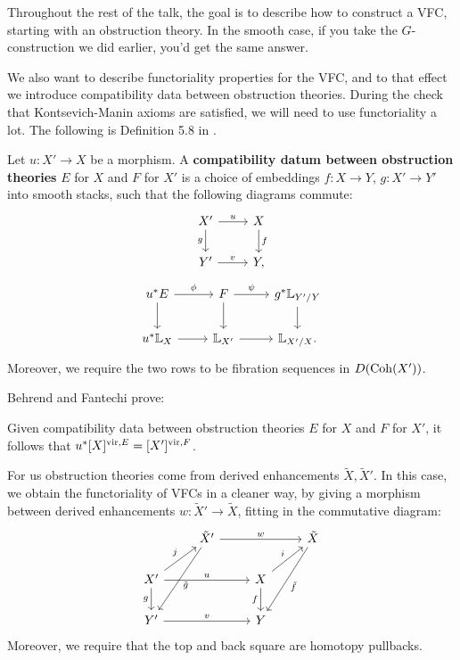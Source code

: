 Throughout the rest of the talk, the goal is to describe how to construct a VFC, starting with an obstruction theory. In the
smooth case, if you take the $G$-construction we did earlier, you'd get the same answer. 

We also want to describe functoriality properties for the VFC, and to that effect we introduce compatibility data
between obstruction theories. 
During the check that Kontsevich-Manin axioms are satisfied, we will need to use functoriality a lot.
The following is Definition 5.8
in \cite{Behrend_Intrinsic_normal_cone_1997}.


\begin{defin}
\label{defin:compatibility_datum}
Let $u:X' \to X$ be a morphism.
A \textbf{compatibility datum between obstruction theories} $E$ for $X$ and $ F$ for $X'$ is a choice of embeddings
$f: X \to Y$, $g: X' \to Y'$ into smooth stacks, such that the following diagrams commute:
\[
\begin{tikzcd}
X'\arrow{r}{u} \arrow[swap]{d}{g} & X\arrow{d}{f} \\ Y'\arrow{r}{v} & Y,
\end{tikzcd}
\]
\[
\begin{tikzcd}
u^* E \arrow{d}\arrow{r}{\phi} & F \arrow{r}{\psi}\arrow{d} & g^* \bbL_{Y'/Y}\arrow{d} \\
u^* \bbL_X \arrow{r} & \bbL_{X'} \arrow{r} & \bbL_{X'/X} .
\end{tikzcd}
\]
Moreover, we require the two rows to be fibration sequences in $D(\mathrm{Coh}(X'))$.
\end{defin}

Behrend and Fantechi prove:

\begin{prop}
Given compatibility data between obstruction theories $E$ for $X$ and $F$ for $X'$, it follows that 
$u^*[X]^{\operatorname{vir}, E} = [X']^{\operatorname{vir}, F}$.
\end{prop}

For us obstruction theories come from derived enhancements $\tilde X, \tilde X'$.
In this case, we obtain the functoriality of VFCs in a cleaner way, by giving a morphism between derived
enhancements $w: \tilde X' \to \tilde X$, fitting in the commutative diagram:
\[
\begin{tikzcd}
\; & \tilde X'\arrow{rr}{w}\arrow{ddl}{\tilde g} & & \tilde X\arrow{ddl}{\tilde f} \\
X'\arrow{rr}{u}\arrow[swap]{d}{g}\arrow{ur}{j} & & X\arrow[swap]{d}{f}\arrow{ur}{i} & \\
Y'\arrow{rr}{v} & & Y &
\end{tikzcd}
\]
Moreover, we require that the top and back square are homotopy pullbacks.

